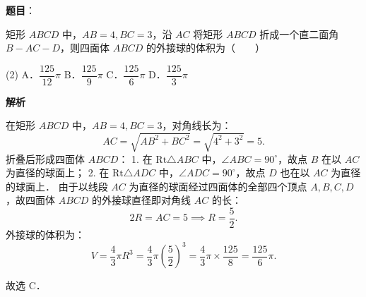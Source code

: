 \begin{answer}

\textbf{题目}：

矩形 $ABCD$ 中，$AB = 4, BC = 3$，沿 $AC$ 将矩形 $ABCD$ 折成一个直二面角 $B - AC - D$，则四面体 $ABCD$ 的外接球的体积为\mbox{（　　）}

\begin{gkopts}(2)
\task A．$\dfrac{125}{12}\pi$
\task B．$\dfrac{125}{9}\pi$
\task C．$\dfrac{125}{6}\pi$
\task D．$\dfrac{125}{3}\pi$
\end{gkopts}

\textbf{解析}

在矩形 $ABCD$ 中，$AB = 4, BC = 3$，对角线长为：
\nopagebreak[4]
\[
AC = \sqrt{AB^2 + BC^2} = \sqrt{4^2 + 3^2} = 5.
\]
折叠后形成四面体 $ABCD$：
1. 在 $\mathrm{Rt}\triangle ABC$ 中，$\angle ABC = 90^\circ$，故点 $B$ 在以 $AC$ 为直径的球面上；
2. 在 $\mathrm{Rt}\triangle ADC$ 中，$\angle ADC = 90^\circ$，故点 $D$ 也在以 $AC$ 为直径的球面上．
由于以线段 $AC$ 为直径的球面经过四面体的全部四个顶点 $A, B, C, D$，故四面体 $ABCD$ 的外接球直径即对角线 $AC$ 的长：
\nopagebreak[4]
\[
2R = AC = 5 \implies R = \dfrac{5}{2}.
\]
外接球的体积为：
\nopagebreak[4]
\[
V = \dfrac{4}{3}\pi R^3 = \dfrac{4}{3}\pi \left(\dfrac{5}{2}\right)^3 = \dfrac{4}{3}\pi \times \dfrac{125}{8} = \dfrac{125}{6}\pi.
\]

故选 C．


\end{answer}
